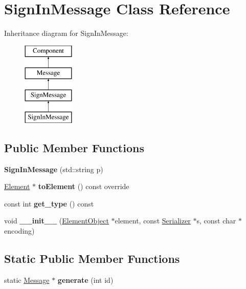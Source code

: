 \hypertarget{classSignInMessage}{}\section{Sign\+In\+Message Class Reference}
\label{classSignInMessage}
Inheritance diagram for Sign\+In\+Message\+:\begin{figure}[H]
\begin{center}
\leavevmode
\includegraphics[height=4.000000cm]{classSignInMessage}
\end{center}
\end{figure}
\subsection*{Public Member Functions}
\begin{DoxyCompactItemize}
\item 
\mbox{\label{classSignInMessage_accb3dfaad2cca80d6709873a783f895b}} 
{\bfseries Sign\+In\+Message} (std\+::string p)
\item 
\mbox{\label{classSignMessage_aee897c4bf78df966b8cca95e589566e4}} 
\mbox{\hyperlink{classElement}{Element}} $\ast$ {\bfseries to\+Element} () const override
\item 
\mbox{\label{classMessage_a2a576dcffd45c4574fcdf2897ec26086}} 
const int {\bfseries get\+\_\+type} () const
\item 
\mbox{\label{classComponent_a28212595f8ee85fe009bd233bc99b2fc}} 
void {\bfseries \+\_\+\+\_\+init\+\_\+\+\_\+} (\mbox{\hyperlink{classElementObject}{Element\+Object}} $\ast$element, const \mbox{\hyperlink{classSerializer}{Serializer}} $\ast$s, const char $\ast$encoding)
\end{DoxyCompactItemize}
\subsection*{Static Public Member Functions}
\begin{DoxyCompactItemize}
\item 
\mbox{\label{classMessage_ad92a0e1cfa5b5a503ec9c61833e3e5ea}} 
static \mbox{\hyperlink{classMessage}{Message}} $\ast$ {\bfseries generate} (int id)
\end{DoxyCompactItemize}
